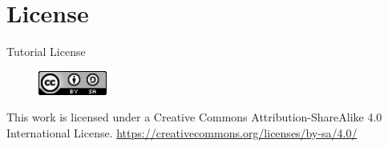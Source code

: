 \documentclass{beamer}
\begin{document}
\section{License}

\begin{frame}{Tutorial License}
  \begin{figure}[!t]
    \includegraphics[width=0.2\textwidth]{../images/cc-by-sa.png}
  \end{figure}
  \centering
  This work is licensed under a Creative Commons Attribution-ShareAlike 4.0 International License.
  \url{https://creativecommons.org/licenses/by-sa/4.0/}
\end{frame}
\end{document}
